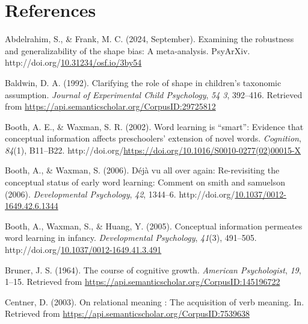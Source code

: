 \documentclass[10pt, letterpaper]{article}
\newenvironment{CSLReferences}%
  {}%
  {\par}
\begin{document}
\hypertarget{references}{%
\section{References}\label{references}}

\setlength{\parindent}{-0.1in} 
\setlength{\leftskip}{0.125in}

\noindent

\hypertarget{refs}{}
\begin{CSLReferences}{1}{0}
\leavevmode{}%
Abdelrahim, S., \& Frank, M. C. (2024, September). Examining the
robustness and generalizability of the shape bias: A meta-analysis.
PsyArXiv.
http://doi.org/\href{https://doi.org/10.31234/osf.io/3by54}{10.31234/osf.io/3by54}

\leavevmode{}%
Baldwin, D. A. (1992). Clarifying the role of shape in children's
taxonomic assumption. \emph{Journal of Experimental Child Psychology},
\emph{54 3}, 392--416. Retrieved from
\url{https://api.semanticscholar.org/CorpusID:29725812}

\leavevmode{}%
Booth, A. E., \& Waxman, S. R. (2002). Word learning is {``smart''}:
Evidence that conceptual information affects preschoolers' extension of
novel words. \emph{Cognition}, \emph{84}(1), B11--B22.
http://doi.org/\url{https://doi.org/10.1016/S0010-0277(02)00015-X}

\leavevmode{}%
Booth, A., \& Waxman, S. (2006). Déjà vu all over again: Re-revisiting
the conceptual status of early word learning: Comment on smith and
samuelson (2006). \emph{Developmental Psychology}, \emph{42}, 1344--6.
http://doi.org/\href{https://doi.org/10.1037/0012-1649.42.6.1344}{10.1037/0012-1649.42.6.1344}

\leavevmode{}%
Booth, A., Waxman, S., \& Huang, Y. (2005). Conceptual information
permeates word learning in infancy. \emph{Developmental Psychology},
\emph{41}(3), 491--505.
http://doi.org/\href{https://doi.org/10.1037/0012-1649.41.3.491}{10.1037/0012-1649.41.3.491}

\leavevmode{}%
Bruner, J. S. (1964). The course of cognitive growth. \emph{American
Psychologist}, \emph{19}, 1--15. Retrieved from
\url{https://api.semanticscholar.org/CorpusID:145196722}

\leavevmode{}%
Centner, D. (2003). On relational meaning : The acquisition of verb
meaning. In. Retrieved from
\url{https://api.semanticscholar.org/CorpusID:7539638}


\end{CSLReferences}
\end{document}
